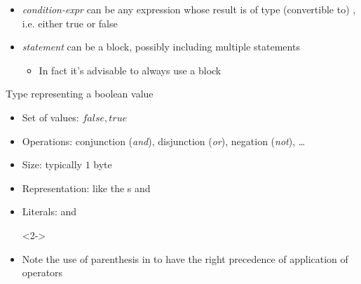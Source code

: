 \begin{frame}[fragile]{}
\begin{itemize}
\begin{columns}[t]
  \end{columns}

  \item<5-> \textit{condition-expr} can be any expression whose result is of type
    (convertible to) , i.e. either true or false

  \item<6-> \textit{statement} can be a block, possibly including multiple
    statements
    \begin{itemize}
    \item In fact it's advisable to always use a block
    \end{itemize}
  \end{itemize}

\end{frame}

\begin{frame}[fragile]{}

  Type representing a boolean value
  \begin{itemize}
  \item Set of values: ${false, true}$
  \item Operations: conjunction (\textit{and}), disjunction (\textit{or}),
    negation (\textit{not}), \ldots
  \item Size: typically $1$ byte
  \item Representation: like the s  and 
  \item Literals:  and 

    \begin{codeblock}<2->{
}\end{codeblock}

  \item<8-> Note the use of parenthesis in  to have the right
    precedence of application of operators
  \end{itemize}


\end{frame}
